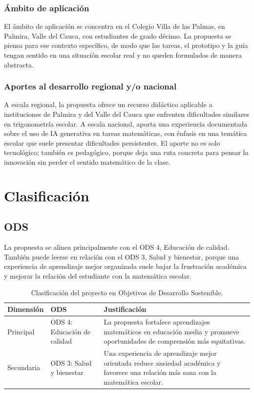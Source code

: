 \documentclass[11pt,spanish,letterpaper,openany]{book}
\begin{document}
\subsection{Ámbito de aplicación}

El ámbito de aplicación se concentra en el Colegio Villa de las Palmas, en Palmira, Valle del Cauca, con estudiantes de grado décimo. La propuesta se piensa para ese contexto específico, de modo que las tareas, el prototipo y la guía tengan sentido en una situación escolar real y no queden formulados de manera abstracta.

\subsection{Aportes al desarrollo regional y/o nacional}

A escala regional, la propuesta ofrece un recurso didáctico aplicable a instituciones de Palmira y del Valle del Cauca que enfrenten dificultades similares en trigonometría escolar. A escala nacional, aporta una experiencia documentada sobre el uso de IA generativa en tareas matemáticas, con énfasis en una temática escolar que suele presentar dificultades persistentes. El aporte no es solo tecnológico; también es pedagógico, porque deja una ruta concreta para pensar la innovación sin perder el sentido matemático de la clase.

\chapter{Clasificación}

\section{ODS}

La propuesta se alinea principalmente con el ODS 4, Educación de calidad. También puede leerse en relación con el ODS 3, Salud y bienestar, porque una experiencia de aprendizaje mejor organizada suele bajar la frustración académica y mejorar la relación del estudiante con la matemática escolar.

\begin{table}[H]
\centering
\caption{Clasificación del proyecto en Objetivos de Desarrollo Sostenible.}
\begin{tabularx}{\textwidth}{>{\raggedright\arraybackslash}p{2.4cm} >{\raggedright\arraybackslash}p{4.6cm} >{\raggedright\arraybackslash}X}
\toprule
Dimensión & ODS & Justificación \\
\midrule
Principal & ODS 4: Educación de calidad & La propuesta fortalece aprendizajes matemáticos en educación media y promueve oportunidades de comprensión más equitativas. \\
Secundaria & ODS 3: Salud y bienestar & Una experiencia de aprendizaje mejor orientada reduce ansiedad académica y favorece una relación más sana con la matemática escolar. \\
\bottomrule
\end{tabularx}
\end{table}
\end{document}
